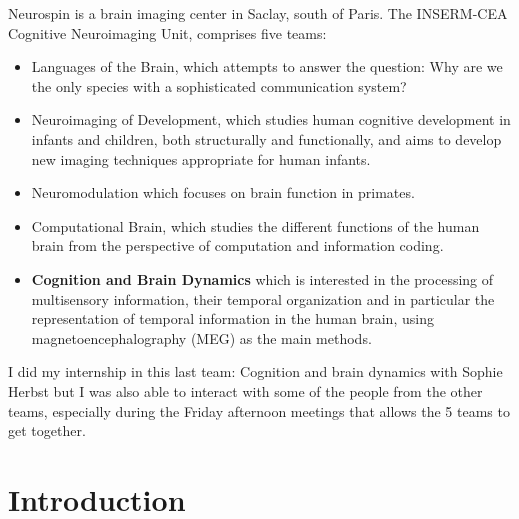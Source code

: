 Neurospin is a brain imaging center in Saclay, south of Paris. The INSERM-CEA Cognitive Neuroimaging Unit, comprises five teams:

\begin{itemize}
    \item Languages of the Brain, which attempts to answer the question: Why are we the only species with a sophisticated communication system?
    \item Neuroimaging of Development, which studies human cognitive development in infants and children, both structurally and functionally, and aims to develop new imaging techniques appropriate for human infants.
    \item Neuromodulation which focuses on brain function in primates.
    \item Computational Brain, which studies the different functions of the human brain from the perspective of computation and information coding.
    \item \textbf{Cognition and Brain Dynamics} which is interested in the processing of multisensory information, their temporal organization and in particular the representation of temporal information in the human brain, using magnetoencephalography (MEG) as the main methods.
\end{itemize}

I did my internship in this last team: Cognition and brain dynamics with Sophie Herbst but I was also able to interact with some of the people from the other teams, especially during the Friday afternoon meetings that allows the 5 teams to get together.





\chapter*{Introduction}


